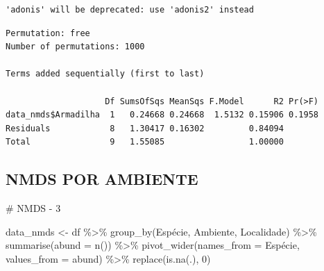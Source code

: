 \documentclass[
  letterpaper,
  DIV=11,
  numbers=noendperiod]{scrartcl}
\newenvironment{Shaded}{\begin{snugshade}}{\end{snugshade}}
\newcommand{\AttributeTok}[1]{\textcolor[rgb]{0.40,0.45,0.13}{#1}}
\newcommand{\CommentTok}[1]{\textcolor[rgb]{0.37,0.37,0.37}{#1}}
\newcommand{\DecValTok}[1]{\textcolor[rgb]{0.68,0.00,0.00}{#1}}
\newcommand{\FunctionTok}[1]{\textcolor[rgb]{0.28,0.35,0.67}{#1}}
\newcommand{\NormalTok}[1]{\textcolor[rgb]{0.00,0.23,0.31}{#1}}
\newcommand{\OtherTok}[1]{\textcolor[rgb]{0.00,0.23,0.31}{#1}}
\newcommand{\SpecialCharTok}[1]{\textcolor[rgb]{0.37,0.37,0.37}{#1}}
\begin{document}
\begin{Shaded}
\end{Shaded}

\begin{verbatim}
'adonis' will be deprecated: use 'adonis2' instead
\end{verbatim}

\begin{Shaded}
\end{Shaded}

\begin{verbatim}
Permutation: free
Number of permutations: 1000

Terms added sequentially (first to last)

                    Df SumsOfSqs MeanSqs F.Model      R2 Pr(>F)
data_nmds$Armadilha  1   0.24668 0.24668  1.5132 0.15906 0.1958
Residuals            8   1.30417 0.16302         0.84094       
Total                9   1.55085                 1.00000       
\end{verbatim}

\hypertarget{nmds-por-ambiente}{%
\subsection{NMDS POR AMBIENTE}\label{nmds-por-ambiente}}

\begin{Shaded}
\begin{Highlighting}[]
\CommentTok{\# NMDS {-} 3 }

\NormalTok{data\_nmds }\OtherTok{\textless{}{-}} 
\NormalTok{  df }\SpecialCharTok{\%\textgreater{}\%}
  \FunctionTok{group\_by}\NormalTok{(Espécie, Ambiente, Localidade) }\SpecialCharTok{\%\textgreater{}\%}
  \FunctionTok{summarise}\NormalTok{(}\AttributeTok{abund =} \FunctionTok{n}\NormalTok{()) }\SpecialCharTok{\%\textgreater{}\%}
  \FunctionTok{pivot\_wider}\NormalTok{(}\AttributeTok{names\_from =}\NormalTok{ Espécie, }\AttributeTok{values\_from =}\NormalTok{ abund) }\SpecialCharTok{\%\textgreater{}\%}
  \FunctionTok{replace}\NormalTok{(}\FunctionTok{is.na}\NormalTok{(.), }\DecValTok{0}\NormalTok{)}
\end{Highlighting}
\end{Shaded}
\end{document}
